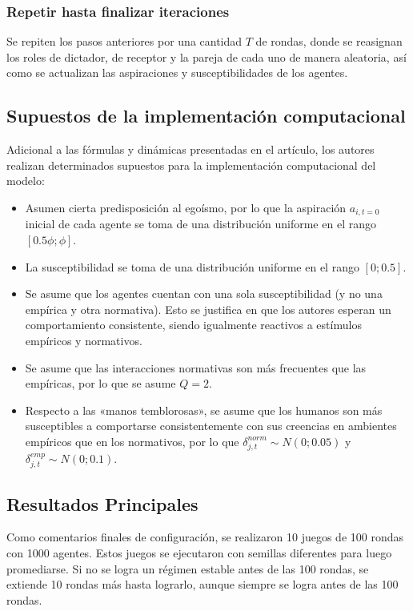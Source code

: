 \documentclass[12pt,a4paper]{article}
\begin{document}
\subsubsection{Repetir hasta finalizar iteraciones}

Se repiten los pasos anteriores por una cantidad $T$ de rondas, donde se reasignan
los roles de dictador, de receptor y la pareja de cada uno de manera aleatoria, así 
como se actualizan las aspiraciones y susceptibilidades de los agentes.

\subsection{Supuestos de la implementación computacional}

Adicional a las fórmulas y dinámicas presentadas en el artículo, los autores realizan determinados 
supuestos para la implementación computacional del modelo:

\begin{itemize}
    \item Asumen cierta predisposición al egoísmo, por lo que la aspiración $a_{i,t=0}$ inicial de cada 
    agente se toma de una distribución uniforme en el rango $[0.5\phi;\phi]$.
    \item La susceptibilidad se toma de una distribución uniforme en el rango $[0;0.5]$.
    \item Se asume que los agentes cuentan con una sola susceptibilidad (y no una empírica y otra normativa). Esto se 
    justifica en que los autores esperan un comportamiento consistente, siendo igualmente reactivos a estímulos empíricos y 
    normativos.
    \item Se asume que las interacciones normativas son más frecuentes que las empíricas, por lo que se asume $Q=2$.
    \item Respecto a las «manos temblorosas», se asume que los humanos son más susceptibles a comportarse consistentemente con 
    sus creencias en ambientes empíricos que en los normativos, por lo que $\delta_{j,t}^{norm} \sim N(0;0.05)$ y 
    $\delta_{j,t}^{emp} \sim N(0;0.1)$.
\end{itemize}

\subsection{Resultados Principales}

Como comentarios finales de configuración, se realizaron 10 juegos de 100 rondas con 1000 agentes. Estos juegos
se ejecutaron con semillas diferentes para luego promediarse. Si no se logra un régimen estable antes de las 100 rondas,
se extiende 10 rondas más hasta lograrlo, aunque siempre se logra antes de las 100 rondas.
\end{document}
